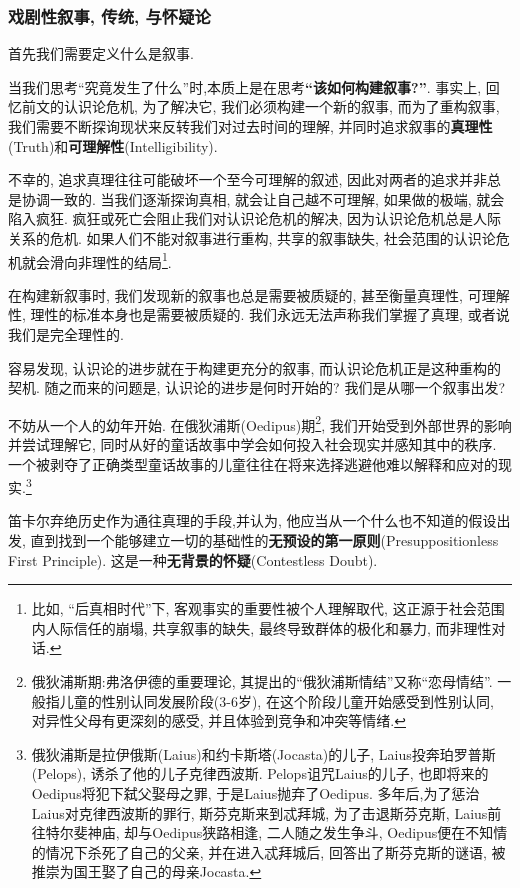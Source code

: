 \documentclass[12pt, a4paper, oneside]{ctexart}
\renewcommand{\b}{\textbf}
\newcommand{\f}{\footnote}
\begin{document}
\subsubsection{戏剧性叙事, 传统, 与怀疑论}

首先我们需要定义什么是叙事.
    
当我们思考``究竟发生了什么''时,本质上是在思考\b{``该如何构建叙事?''}. 事实上, 回忆前文的认识论危机, 为了解决它, 我们必须构建一个新的叙事, 而为了重构叙事, 我们需要不断探询现状来反转我们对过去时间的理解, 并同时追求叙事的\b{真理性}(Truth)和\b{可理解性}(Intelligibility).

不幸的, 追求真理往往可能破坏一个至今可理解的叙述, 因此对两者的追求并非总是协调一致的. 当我们逐渐探询真相, 就会让自己越不可理解, 如果做的极端, 就会陷入疯狂. 疯狂或死亡会阻止我们对认识论危机的解决, 因为认识论危机总是人际关系的危机. 如果人们不能对叙事进行重构, 共享的叙事缺失, 社会范围的认识论危机就会滑向非理性的结局\f{比如, ``后真相时代''下, 客观事实的重要性被个人理解取代, 这正源于社会范围内人际信任的崩塌, 共享叙事的缺失, 最终导致群体的极化和暴力, 而非理性对话. }. 

在构建新叙事时, 我们发现新的叙事也总是需要被质疑的, 甚至衡量真理性, 可理解性, 理性的标准本身也是需要被质疑的. 我们永远无法声称我们掌握了真理, 或者说我们是完全理性的.

容易发现, 认识论的进步就在于构建更充分的叙事, 而认识论危机正是这种重构的契机. 随之而来的问题是, 认识论的进步是何时开始的? 我们是从哪一个叙事出发?

不妨从一个人的幼年开始. 在俄狄浦斯(Oedipus)期\f{俄狄浦斯期:弗洛伊德的重要理论, 其提出的``俄狄浦斯情结''又称``恋母情结''. 一般指儿童的性别认同发展阶段(3-6岁), 在这个阶段儿童开始感受到性别认同, 对异性父母有更深刻的感受, 并且体验到竞争和冲突等情绪. }, 我们开始受到外部世界的影响并尝试理解它, 同时从好的童话故事中学会如何投入社会现实并感知其中的秩序. 一个被剥夺了正确类型童话故事的儿童往往在将来选择逃避他难以解释和应对的现实.\f{俄狄浦斯是拉伊俄斯(Laius)和约卡斯塔(Jocasta)的儿子, Laius投奔珀罗普斯(Pelops), 诱杀了他的儿子克律西波斯. Pelops诅咒Laius的儿子, 也即将来的Oedipus将犯下弑父娶母之罪, 于是Laius抛弃了Oedipus. 多年后,为了惩治Laius对克律西波斯的罪行, 斯芬克斯来到忒拜城, 为了击退斯芬克斯, Laius前往特尔斐神庙, 却与Oedipus狭路相逢, 二人随之发生争斗, Oedipus便在不知情的情况下杀死了自己的父亲, 并在进入忒拜城后, 回答出了斯芬克斯的谜语, 被推崇为国王娶了自己的母亲Jocasta. }

笛卡尔弃绝历史作为通往真理的手段,并认为, 他应当从一个什么也不知道的假设出发, 直到找到一个能够建立一切的基础性的\b{无预设的第一原则}(Presuppositionless First Principle). 这是一种\b{无背景的怀疑}(Contestless Doubt). 
\end{document}
